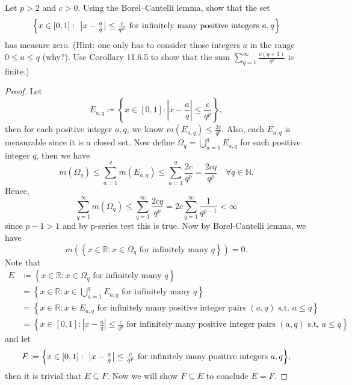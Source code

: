 \begin{problem}
    Let $p>2$ and $c>0$.
Using the Borel--Cantelli lemma, show that the set
$$
\Bigl\{x\in[0,1]:\ \bigl|x-\tfrac{a}{q}\bigr|\le \tfrac{c}{q^p}
\text{ for infinitely many positive integers }a,q\Bigr\}
$$
has measure zero.
(Hint: one only has to consider those integers $a$ in the range $0\le a\le q$ (why?).
Use Corollary 11.6.5 to show that the sum $\sum_{q=1}^\infty \frac{c(q+1)}{q^p}$ is finite.)
\end{problem}

\begin{proof}
    Let 
    \[
        E_{a, q} \coloneqq \left\{ x \in [0, 1]: \left\vert x - \frac{a}{q} \right\vert \le \frac{c}{q^p}  \right\},
    \]
    then for each positive integer \(a, q\), we know \(m(E_{a, q}) \le \frac{2c}{q^p}\). Also, each \(E_{a, q}\) is measurable since it is a closed set. Now define \(\Omega _q = \bigcup_{a=1}^{q} E_{a, q} \) for each positive integer \(q\), then we have
    \[
        m(\Omega _q) \le \sum_{a=1}^q m(E_{a, q}) \le \sum_{a=1}^q \frac{2c}{q^p} = \frac{2cq}{q^p} \quad \forall q \in \mathbb{N}. 
    \]    
    Hence,
    \[
        \sum_{q=1}^{\infty} m(\Omega _q) \le \sum_{q=1}^{\infty} \frac{2cq}{q^p} = 2c \sum_{q=1}^{\infty} \frac{1}{q^{p-1}} < \infty    
    \]
    since \(p - 1 > 1\) and by p-series test this is true. Now by Borel-Cantelli lemma, we have
    \[
        m\left( \left\{ x \in \mathbb{R}: x \in \Omega _q \text{ for infinitely many } q \right\} \right) = 0. 
    \]
    Note that 
    \begin{align*}
        E &\coloneqq \left\{ x \in \mathbb{R}: x \in \Omega _q \text{ for infinitely many } q \right\} \\ &= \left\{ x \in \mathbb{R}: x \in \bigcup_{a=1}^{q} E_{a, q} \text{ for infinitely many } q   \right\} \\
        &= \left\{ x \in \mathbb{R}: x \in E_{a, q} \text{ for infinitely many positive integer pairs } (a, q) \text{ s.t. } a \le q   \right\} \\ 
        &= \left\{ x \in [0, 1]: \left\vert x - \frac{a}{q} \right\vert \le \frac{c}{q^p} \text{ for infinitely many positive integer pairs } (a, q) \text{ s.t. } a \le q    \right\},  
    \end{align*} 
    and let 
    \[
        F\coloneqq \Bigl\{x\in[0,1]:\ \bigl|x-\tfrac{a}{q}\bigr|\le \tfrac{c}{q^p}
\text{ for infinitely many positive integers }a,q\Bigr\},
    \]
    then it is trivial that \(E \subseteq F\). Now we will show \(F \subseteq E\) to conclude \(E = F\). 

\end{proof}
